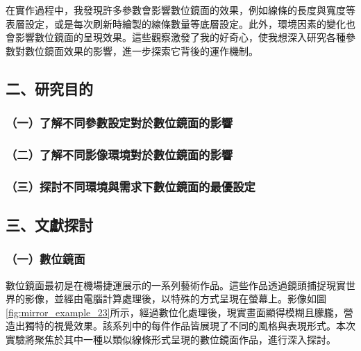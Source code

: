 \documentclass[12pt]{article}
\begin{document}
在實作過程中，我發現許多參數會影響數位鏡面的效果，例如線條的長度與寬度等表層設定，或是每次刷新時繪製的線條數量等底層設定。此外，環境因素的變化也會影響數位鏡面的呈現效果。這些觀察激發了我的好奇心，使我想深入研究各種參數對數位鏡面效果的影響，進一步探索它背後的運作機制。

\subsection{二、研究目的}

\subsubsection{（一）了解不同參數設定對於數位鏡面的影響}
\subsubsection{（二）了解不同影像環境對於數位鏡面的影響}
\subsubsection{（三）探討不同環境與需求下數位鏡面的最優設定}

\newpage

\subsection{三、文獻探討}

\subsubsection{（一）數位鏡面}

數位鏡面最初是\textcite{husart}在機場捷運展示的一系列藝術作品。這些作品透過鏡頭捕捉現實世界的影像，並經由電腦計算處理後，以特殊的方式呈現在螢幕上。影像如圖\ref{fig:mirror_example_23}所示，經過數位化處理後，現實畫面顯得模糊且朦朧，營造出獨特的視覺效果。該系列中的每件作品皆展現了不同的風格與表現形式。本次實驗將聚焦於其中一種以類似線條形式呈現的數位鏡面作品，進行深入探討。
\end{document}
